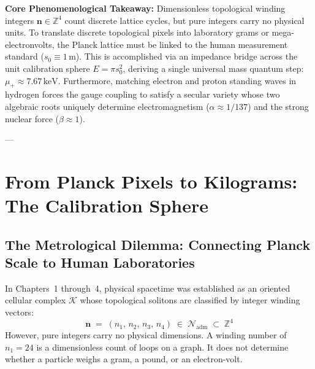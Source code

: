 \documentclass[
    12pt,
    a4paper,
    headings=normal,
    twoside=false,
    open=any,
    parskip=half
]{scrbook}
\newcommand{\spectrumN}{\mathcal{N}_{\text{adm}}}
\begin{document}
\begin{firewallbox}
\textbf{Core Phenomenological Takeaway:} Dimensionless topological winding integers $\mathbf{n} \in \mathbb{Z}^4$ count discrete lattice cycles, but pure integers carry no physical units. To translate discrete topological pixels into laboratory grams or mega-electronvolts, the Planck lattice must be linked to the human measurement standard ($s_0 \equiv 1\,\text{m}$). This is accomplished via an impedance bridge across the unit calibration sphere $E = \pi s_0^2$, deriving a single universal mass quantum step: $\mu_+ \approx 7.67\,\text{keV}$. Furthermore, matching electron and proton standing waves in hydrogen forces the gauge coupling to satisfy a secular variety whose two algebraic roots uniquely determine electromagnetism ($\alpha \approx 1/137$) and the strong nuclear force ($\beta \approx 1$).
\end{firewallbox}

---

\section{From Planck Pixels to Kilograms: The Calibration Sphere}
\label{sec:ch5_calibration_sphere}

\subsection{The Metrological Dilemma: Connecting Planck Scale to Human Laboratories}

In Chapters~1 through~4, physical spacetime was established as an oriented cellular complex $\mathcal{K}$ whose topological solitons are classified by integer winding vectors:
\begin{equation}
\mathbf{n} \;=\; (n_1, \, n_2, \, n_3, \, n_4) \;\in\; \spectrumN \;\subset\; \mathbb{Z}^4
\end{equation}
However, pure integers carry no physical dimensions. A winding number of $n_1 = 24$ is a dimensionless count of loops on a graph. It does not determine whether a particle weighs a gram, a pound, or an electron-volt.
\end{document}
